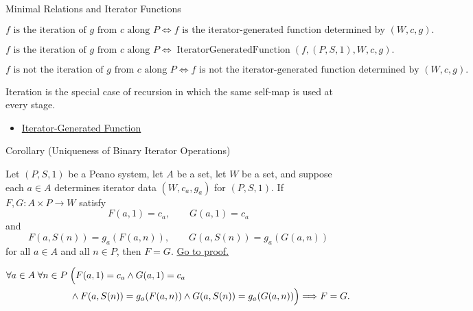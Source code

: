 \begin{topicbox}{Minimal Relations and Iterator Functions}
\begin{remark*}
\[
f \text{ is the iteration of } g \text{ from } c \text{ along } P
\Longleftrightarrow
f \text{ is the iterator-generated function determined by } (W,c,g).
\]
\end{remark*}

\begin{remark*}
\[
f \text{ is the iteration of } g \text{ from } c \text{ along } P
\Longleftrightarrow
\operatorname{IteratorGeneratedFunction}(f,(P,S,1),W,c,g).
\]
\end{remark*}

\begin{remark*}
\[
f \text{ is not the iteration of } g \text{ from } c \text{ along } P
\Longleftrightarrow
f \text{ is not the iterator-generated function determined by } (W,c,g).
\]
\end{remark*}

\begin{remark*}[Interpretation]
Iteration is the special case of recursion in which the same self-map is used
at every stage.
\end{remark*}

\begin{dependencies}
\begin{itemize}
  \item \hyperref[def:iterator-generated-function]{Iterator-Generated Function}
\end{itemize}
\end{dependencies}

\begin{corollarybox}{Corollary (Uniqueness of Binary Iterator Operations)}
\begin{corollary}
\label{cor:uniqueness-of-binary-iterator-operations}
Let $(P,S,1)$ be a Peano system, let $A$ be a set, let $W$ be a set, and
suppose each $a\in A$ determines iterator data $(W,c_a,g_a)$ for $(P,S,1)$.
If $F,G:A\times P\to W$ satisfy
\[
F(a,1)=c_a,\qquad G(a,1)=c_a
\]
and
\[
F(a,S(n))=g_a(F(a,n)),
\qquad
G(a,S(n))=g_a(G(a,n))
\]
for all $a\in A$ and all $n\in P$, then $F=G$.
\hyperref[prf:uniqueness-of-binary-iterator-operations]{Go to proof.}
\end{corollary}
\end{corollarybox}

\begin{remark*}
\[
\begin{aligned}
\forall a\in A\;\forall n\in P\;&\Bigl(
F(a,1)=c_a\land G(a,1)=c_a\\
&\land F(a,S(n))=g_a(F(a,n))
\land G(a,S(n))=g_a(G(a,n))\Bigr)
\Longrightarrow F=G.
\end{aligned}
\]
\end{remark*}


\end{topicbox}

